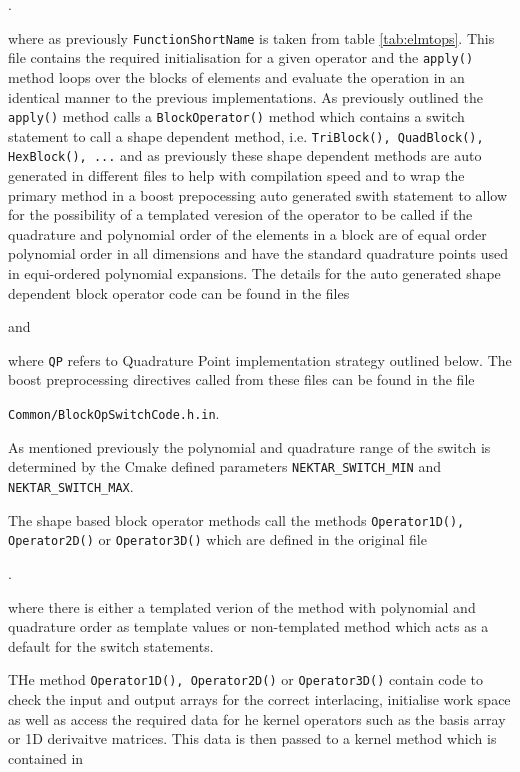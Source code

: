 . 

\noindent where as previously \texttt{FunctionShortName} is taken from
table \ref{tab:elmtops}. This file contains the required
initialisation for a given operator and the \texttt{apply()} method
loops over the blocks of elements and evaluate the operation in an
identical manner to the previous implementations. As previously
outlined the \texttt{apply()} method calls a \texttt{BlockOperator()}
method which contains a switch statement to call a shape dependent
method, i.e. \texttt{TriBlock(), QuadBlock(), HexBlock(), ...} and as
previously these shape dependent methods are auto generated in
different files to help with compilation speed and to wrap the primary
method in a boost prepocessing auto generated swith statement to allow
for the possibility of a templated veresion of the operator to be
called if the quadrature and polynomial order of the elements in a
block are of equal order polynomial order in all dimensions and have
the standard quadrature points used in equi-ordered polynomial
expansions. The details for the auto generated shape dependent block
operator code can be found in the files


and 


\noindent where \texttt{QP} refers to Quadrature Point implementation
strategy outlined below. The boost preprocessing directives called
from these files can be found in the file

\texttt{Common/BlockOpSwitchCode.h.in}.

\noindent As mentioned previously the
polynomial and quadrature range of the switch is determined by the
Cmake defined parameters \texttt{NEKTAR\_SWITCH\_MIN} and
\texttt{NEKTAR\_SWITCH\_MAX}.

The shape based block operator methods call the methods
\texttt{Operator1D(), Operator2D()} or \texttt{Operator3D()} which are
defined in the original file

. 

\noindent where there is either a templated verion of the method with
polynomial and quadrature order as template values or non-templated
method which acts as a default for the switch statements.

THe method \texttt{Operator1D(), Operator2D()} or
\texttt{Operator3D()} contain code to check the input and output
arrays for the correct interlacing, initialise work space as well as
access the required data for he kernel operators such as the basis
array or 1D derivaitve matrices. This data is then passed to a kernel
method which is contained in

